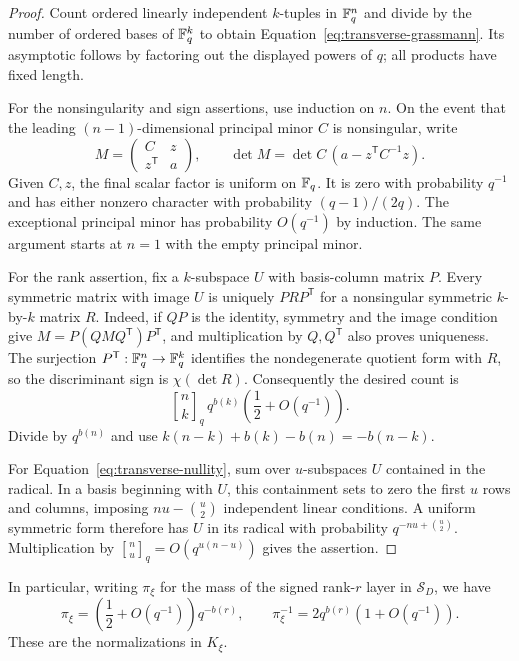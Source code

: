 \begin{proof}
Count ordered linearly independent $k$-tuples in $\mathbb F_q^n$ and divide
by the number of ordered bases of $\mathbb F_q^k$ to obtain
Equation~\eqref{eq:transverse-grassmann}. Its asymptotic follows by factoring
out the displayed powers of $q$; all products have fixed length.

For the nonsingularity and sign assertions, use induction on $n$.
On the event that the leading $(n-1)$-dimensional principal minor $C$
is nonsingular, write
\[
 M=\begin{pmatrix}C&z\\z^{\mathsf T}&a\end{pmatrix},\qquad
 \det M=\det C\,(a-z^{\mathsf T}C^{-1}z).
\]
Given $C,z$, the final scalar factor is uniform on $\mathbb F_q$. It is zero
with probability $q^{-1}$ and has either nonzero character with
probability $(q-1)/(2q)$. The exceptional principal minor has probability
$O(q^{-1})$ by induction. The same argument starts at $n=1$ with the
empty principal minor.

For the rank assertion, fix a $k$-subspace $U$ with basis-column matrix
$P$. Every symmetric matrix with image $U$ is uniquely
$PRP^{\mathsf T}$ for a nonsingular symmetric $k$-by-$k$ matrix $R$.
Indeed, if $Q P$ is the identity, symmetry and the image condition give
$M=P(QMQ^{\mathsf T})P^{\mathsf T}$, and multiplication by $Q,Q^{\mathsf T}$
also proves uniqueness. The surjection $P^{\mathsf T}:\mathbb F_q^n\to\mathbb F_q^k$
identifies the nondegenerate quotient form with $R$, so the discriminant
sign is $\chi(\det R)$. Consequently the desired count is
\[
 \genfrac{[}{]}{0pt}{}{n}{k}_q\,q^{b(k)}
 \left(\frac12+O(q^{-1})\right).
\]
Divide by $q^{b(n)}$ and use
$k(n-k)+b(k)-b(n)=-b(n-k)$.

For Equation~\eqref{eq:transverse-nullity}, sum over $u$-subspaces $U$
contained in the radical. In a basis beginning with $U$, this containment
sets to zero the first $u$ rows and columns, imposing
$nu-\binom u2$ independent linear conditions. A uniform symmetric form
therefore has $U$ in its radical with probability
$q^{-nu+\binom u2}$. Multiplication by
$\genfrac{[}{]}{0pt}{}{n}{u}_q=O(q^{u(n-u)})$ gives the assertion.
\end{proof}

In particular, writing $\pi_\xi$ for the mass of the signed rank-$r$
layer in $\mathcal S_D$, we have
\begin{equation}
\label{eq:transverse-signed-mass}
 \pi_\xi=\left(\frac12+O(q^{-1})\right)q^{-b(r)},
 \qquad \pi_\xi^{-1}=2q^{b(r)}(1+O(q^{-1})).
\end{equation}
These are the normalizations in $K_\xi$.

